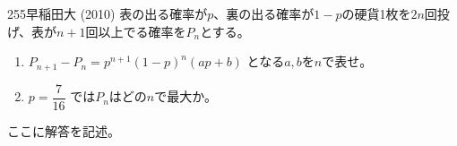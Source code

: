 \begin{prob}{255}{}{早稲田大 (2010)}
 表の出る確率が$p$、裏の出る確率が$1-p$の硬貨1枚を$2n$回投げ、表が$n+1$回以上でる確率を$P_n$とする。
 \begin{enumerate}
  \item $P_{n+1}-P_n=p^{n+1}(1-p)^n(ap+b)$ となる$a,b$を$n$で表せ。
  \item $p=\dfrac{7}{16}$ では$P_n$はどの$n$で最大か。
 \end{enumerate}
\end{prob}
ここに解答を記述。